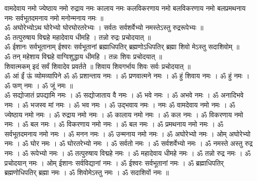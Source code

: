 \documentclass[12pt]{article}
\begin{document}
{{{वामदेवाय नमो ज्येष्ठाय नमो रुद्राय नमः कालाय नमः कलविकरणाय नमो बलविकरणाय नमो बलप्रमथनाय नमः सर्वभूतदमनाय नमो मनोन्मनाय नमः ॥\\[5pt] 
ॐ अघोरेभ्योऽथ घोरेभ्यो घोरघोरतरेभ्यः । सर्वतः सर्वशर्वेभ्यो नमस्तेऽस्तु रुद्ररूपेभ्यः ॥\\[5pt] 
ॐ तत्पुरुषाय विद्महे महादेवाय धीमहि । तन्नो रुद्रः प्रचोदयात् ॥\\[5pt] 
ॐ ईशानः सर्वभूतानाम् ईश्वरः सर्वभूतानां ब्रह्माधिपतिर् ब्रह्मणोऽधिपतिर् ब्रह्मा शिवो मेऽस्तु सदाशिवोम् ॥\\[5pt] 
ॐ तन् महेशाय विद्महे वाग्विशुद्धाय धीमहि । तन्नः शिवः प्रचोदयात् ॥\\[5pt] 
शिवात्मकम् इदं सर्वं शिवादेव प्रवर्तते ॥ शिवाय शिवगर्भाय शिवः सर्वः प्रचोदयात् ॥\\[5pt] 
ॐ आं ईं ऊं व्योमव्यापिने ॐ ॐ प्रशान्ताय नमः । ॐ प्रणवात्मने नमः । ॐ हुं शिवाय नमः । ॐ हुं नमः । ॐ फण् नमः । ॐ जूं नमः ॥\\[5pt] 
ॐ सद्योजातं प्रपद्यामि नमः । ॐ सद्योजाताय वै नमः । ॐ भवे नमः । ॐ अभवे नमः । ॐ अनादिभवे नमः । ॐ भजस्व मां नमः । ॐ भव नमः । ॐ उद्भवाय नमः । नमः ॐ वामदेवाय नमो नमः । ॐ ज्येष्ठाय नमो नमः । ॐ रुद्राय नमो नमः । ॐ कालाय नमो नमः । ॐ कल नमः । ॐ विकरणाय नमो नमः । ॐ बल नमः । ॐ विकरणाय नमो नमः । ॐ बल नमः । ॐ प्रमथनाय नमो नमः । ॐ सर्वभूतदमनाय नमो नमः । ॐ मनन नमः । ॐ उन्मनाय नमो नमः । ॐ अघोरेभ्यो नमः । ओम् अघोरेभ्यो नमः । ॐ घोर नमः । ॐ घोरतरेभ्यो नमः । ॐ सर्वतो नमः । ॐ सर्वशर्वेभ्यो नमः । ॐ नमस्ते अस्तु रुद्र नमः । ॐ रूपेभ्यो नमः । ॐ तत्पुरुषाय विद्महे नमः । ॐ महादेवाय धीमहे नमः । ॐ तन्नो रुद्र नमः । ॐ प्रचोदयान् नमः । ओम् ईशानः सर्वविद्यानां नमः । ॐ ईश्वरः सर्वभूतानां नमः । ॐ ब्रह्माधिपतिर् ब्रह्मणोधिपतिर् ब्रह्मा नमः । ॐ शिवोमेऽस्तु नमः । ॐ सदाशिवों नमः ॥
}}}
\end{document}
